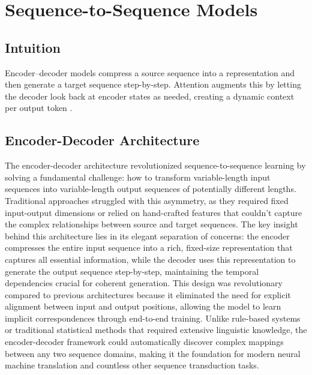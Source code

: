 
\section{Sequence-to-Sequence Models }
\label{sec:seq2seq}

\subsection*{Intuition}

Encoder–decoder models compress a source sequence into a representation and then generate a target sequence step-by-step. Attention augments this by letting the decoder look back at encoder states as needed, creating a dynamic context per output token \cite{Cho2014,Bahdanau2014}.




\subsection{Encoder-Decoder Architecture}

The encoder-decoder architecture revolutionized sequence-to-sequence learning by solving a fundamental challenge: how to transform variable-length input sequences into variable-length output sequences of potentially different lengths. Traditional approaches struggled with this asymmetry, as they required fixed input-output dimensions or relied on hand-crafted features that couldn't capture the complex relationships between source and target sequences. The key insight behind this architecture lies in its elegant separation of concerns: the encoder compresses the entire input sequence into a rich, fixed-size representation that captures all essential information, while the decoder uses this representation to generate the output sequence step-by-step, maintaining the temporal dependencies crucial for coherent generation. This design was revolutionary compared to previous architectures because it eliminated the need for explicit alignment between input and output positions, allowing the model to learn implicit correspondences through end-to-end training. Unlike rule-based systems or traditional statistical methods that required extensive linguistic knowledge, the encoder-decoder framework could automatically discover complex mappings between any two sequence domains, making it the foundation for modern neural machine translation and countless other sequence transduction tasks.

